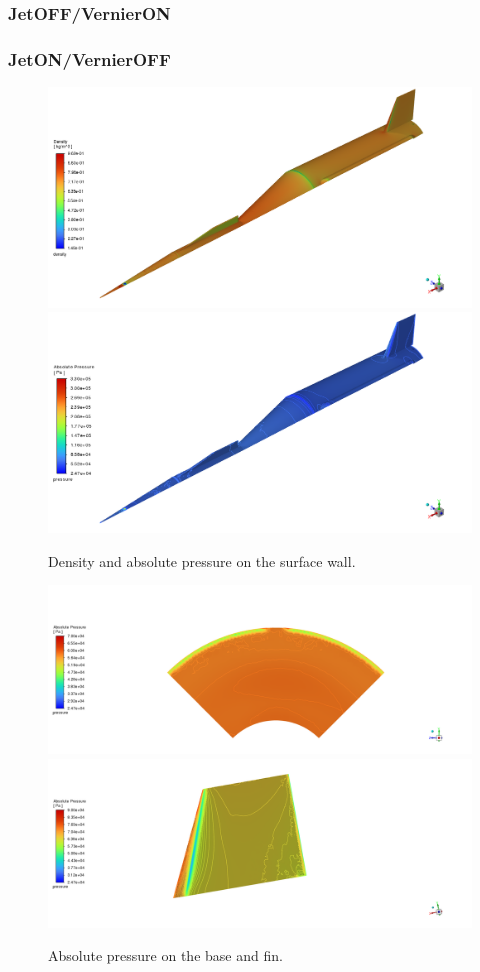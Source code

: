 \documentclass[12pt]{article}
\begin{document}
\subsubsection{JetOFF/VernierON}

\subsubsection{JetON/VernierOFF}

\begin{figure}[H]
    \centering
    \includegraphics[width=0.495\linewidth]{figs/t34s/t34s_M0p65_rho.png}
    \includegraphics[width=0.495\linewidth]{figs/t34s/t34s_M0p65_Pabsolute.png}
    \caption{Density and absolute pressure on the surface wall.}
    \label{fig:t35s_rho_pabs}
\end{figure}
\begin{figure}[H]
    \centering
    \includegraphics[width=0.495\linewidth]{figs/t34s/t34s_M0p65_base_absP.png}
    \includegraphics[width=0.495\linewidth]{figs/t34s/t34s_M0p65_fin_absP.png}
    \caption{Absolute pressure on the base and fin.}
    \label{fig:t35s_base_fin_pabs}
\end{figure}
\end{document}
